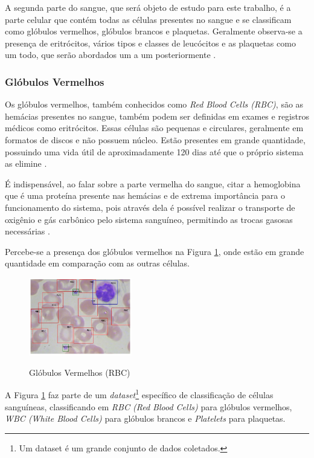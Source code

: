 A segunda parte do sangue, que será objeto de estudo para este trabalho, é a parte celular que contém todas as células presentes no sangue e se classificam como glóbulos vermelhos, glóbulos brancos e plaquetas. Geralmente observa-se a presença de eritrócitos, vários tipos e classes de leucócitos e as plaquetas como um todo, que serão abordados um a um posteriormente \cite{atlasDeHematologiaEAnalise}.

\subsubsection{Glóbulos Vermelhos}
Os glóbulos vermelhos, também conhecidos como \emph{Red Blood Cells (RBC)}, são as hemácias presentes no sangue, também podem ser definidas em exames e registros médicos como eritrócitos. Essas células são pequenas e circulares, geralmente em formatos de discos e não possuem núcleo. Estão presentes em grande quantidade, possuindo uma vida útil de aproximadamente 120 dias até que o próprio sistema as elimine \cite{abcOfCbc}.

É indispensável, ao falar sobre a parte vermelha do sangue, citar a hemoglobina que é uma proteína presente nas hemácias e de extrema importância para o funcionamento do sistema, pois através dela é possível realizar o transporte de oxigênio e gás carbônico pelo sistema sanguíneo, permitindo as trocas gasosas necessárias \cite{manualHematologia}.

Percebe-se a presença dos glóbulos vermelhos na Figura \ref{fig:rbc}, onde estão em grande quantidade em comparação com as outras células. 

\begin{figure}[!htb]
	\centering
	\caption{Glóbulos Vermelhos (RBC)}
	\includegraphics[width=0.40\textwidth]{img/rbc.jpg}
	\label{fig:rbc}
\end{figure}

A Figura \ref{fig:rbc} faz parte de um \emph{dataset}\footnote[1]{Um dataset é um grande conjunto de dados coletados.} específico de classificação de células sanguíneas, classificando em \emph{RBC (Red Blood Cells)} para glóbulos vermelhos, \emph{WBC (White Blood Cells)} para glóbulos brancos e \emph{Platelets} para plaquetas.
 
